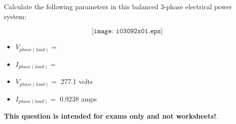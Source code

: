 

Calculate the following parameters in this balanced 3-phase electrical power system:

$$\texttt{[image: i03092x01.eps]}$$

\begin{itemize}
\item{} $V_{phase(load)} =$
\vskip 10pt
\item{} $I_{phase(load)} =$
\end{itemize}







\begin{itemize}
\item{} $V_{phase(load)} =$ 277.1 volts
\vskip 10pt
\item{} $I_{phase(load)} =$ 0.9238 amps
\end{itemize}







{\bf This question is intended for exams only and not worksheets!}.




